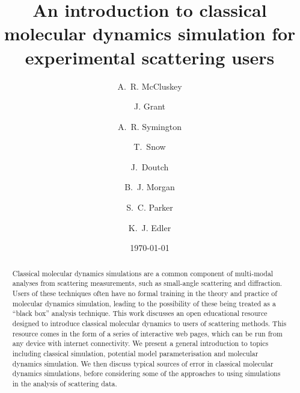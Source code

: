 \documentclass[amsmath,amssymb,twocolumn,superscriptaddress]{revtex4-1}
\begin{document}

\title{An introduction to classical molecular dynamics simulation for experimental scattering users}

\author{A.~R. McCluskey}

\author{J. Grant}

\author{A.~R. Symington}

\author{T.~Snow}

\author{J.~Doutch}

\author{B.~J. Morgan}

\author{S.~C. Parker}

\author{K.~J. Edler}

\date{\today}

\begin{abstract}
\noindent Classical molecular dynamics simulations are a common component of multi-modal analyses from scattering measurements, such as small-angle scattering and diffraction.
Users of these techniques often have no formal training in the theory and practice of molecular dynamics simulation, leading to the possibility of these being treated as a ``black box'' analysis technique.
This work discusses an open educational resource designed to introduce classical molecular dynamics to users of scattering methods.
This resource comes in the form of a series of interactive web pages, which can be run from any device with internet connectivity.
We present a general introduction to topics including classical simulation, potential model parameterisation and molecular dynamics simulation.
We then discuss typical sources of error in classical molecular dynamics simulations, before considering some of the approaches to using simulations in the analysis of scattering data.
\end{abstract}
\end{document}
